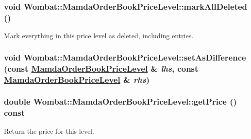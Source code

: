 \hypertarget{classWombat_1_1MamdaOrderBookPriceLevel_f3f8d51f8b417aefb9a7df2e7c46328d}{
\subsubsection[markAllDeleted]{\setlength{\rightskip}{0pt plus 5cm}void Wombat::Mamda\-Order\-Book\-Price\-Level::mark\-All\-Deleted ()}}
\label{classWombat_1_1MamdaOrderBookPriceLevel_f3f8d51f8b417aefb9a7df2e7c46328d}


Mark everything in this price level as deleted, including entries. 

\hypertarget{classWombat_1_1MamdaOrderBookPriceLevel_cc06a4e859dbcb33b734b5702c7757e2}{
\subsubsection[setAsDifference]{\setlength{\rightskip}{0pt plus 5cm}void Wombat::Mamda\-Order\-Book\-Price\-Level::set\-As\-Difference (const \hyperlink{classWombat_1_1MamdaOrderBookPriceLevel}{Mamda\-Order\-Book\-Price\-Level} \& {\em lhs}, const \hyperlink{classWombat_1_1MamdaOrderBookPriceLevel}{Mamda\-Order\-Book\-Price\-Level} \& {\em rhs})}}
\label{classWombat_1_1MamdaOrderBookPriceLevel_cc06a4e859dbcb33b734b5702c7757e2}


\hypertarget{classWombat_1_1MamdaOrderBookPriceLevel_7a7965a7898f85c98af6ee0d27399bed}{
\subsubsection[getPrice]{\setlength{\rightskip}{0pt plus 5cm}double Wombat::Mamda\-Order\-Book\-Price\-Level::get\-Price () const}}
\label{classWombat_1_1MamdaOrderBookPriceLevel_7a7965a7898f85c98af6ee0d27399bed}


Return the price for this level. 

